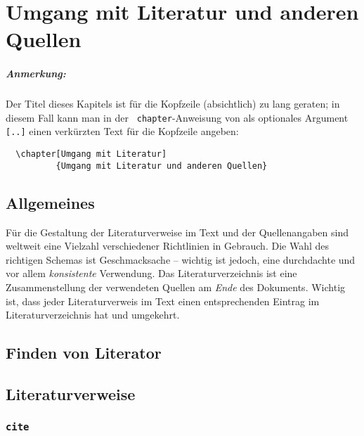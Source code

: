 \chapter[Umgang mit Literatur]{Umgang mit Literatur und anderen Quellen}
\label{cha:Literatur}


\paragraph{Anmerkung:}
Der Titel dieses Kapitels ist für die Kopfzeile (absichtlich) zu
lang geraten; in diesem Fall kann man in der {\tt
chapter}-Anweisung von \latex als optionales Argument \verb![..]! einen verkürzten Text für die
Kopfzeile angeben:
\begin{verbatim}
  \chapter[Umgang mit Literatur]
          {Umgang mit Literatur und anderen Quellen}
\end{verbatim}

\section{Allgemeines}

Für die Gestaltung der Literaturverweise im Text und der
Quellenangaben sind weltweit eine Vielzahl verschiedener Richtlinien in
Gebrauch. Die Wahl des richtigen Schemas ist Geschmacksache -- wichtig ist jedoch,
eine durchdachte und vor allem \emph{konsistente} Verwendung.
Das Literaturverzeichnis ist eine
Zusammenstellung der verwendeten Quellen am \emph{Ende} des Dokuments.
Wichtig ist, dass jeder Literaturverweis im Text einen entsprechenden
Eintrag im Literaturverzeichnis hat und umgekehrt.

\section{Finden von Literator}



\section{Literaturverweise}

\subsection{{\tt cite}}

